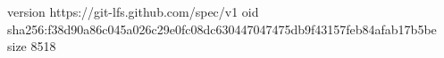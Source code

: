 version https://git-lfs.github.com/spec/v1
oid sha256:f38d90a86c045a026c29e0fc08dc630447047475db9f43157feb84afab17b5be
size 8518
